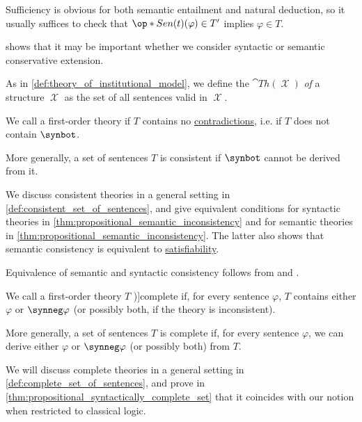 \begin{definition}
\begin{thmenum}
    Sufficiency is obvious for both semantic entailment and natural deduction, so it usually suffices to check that \( \op*{Sen}(t)(\varphi) \in T' \) implies \( \varphi \in T \).

     shows that it may be important whether we consider syntactic or semantic conservative extension.

     As in \cref{def:theory_of_institutional_model}, we define the  \( \cat{Th}(\mscrX) \) \emph{of} a structure \( \mscrX \) as the set of all sentences valid in \( \mscrX \).

     We call a first-order theory  if \( T \) contains no \hyperref[def:fol_semantics/tautology]{contradictions}, i.e. if \( T \) does not contain \( \synbot \).

    More generally, a set of sentences \( T \) is consistent if \( \synbot \) cannot be derived from it.

    We discuss consistent theories in a general setting in \cref{def:consistent_set_of_sentences}, and give equivalent conditions for syntactic theories in \cref{thm:propositional_semantic_inconsistency} and for semantic theories in \cref{thm:propositional_semantic_inconsistency}. The latter also shows that semantic consistency is equivalent to \hyperref[def:propositional_semantics/satisfaction]{satisfiability}.

    Equivalence of semantic and syntactic consistency follows from  and .

     We call a first-order theory \( T \) \term[ru=полное (множество формул) (\cite[def. 2.6.20]{Герасимов2014Вычислимость})]{complete} if, for every sentence \( \varphi \), \( T \) contains either \( \varphi \) or \( \synneg \varphi \) (or possibly both, if the theory is inconsistent).

    More generally, a set of sentences \( T \) is complete if, for every sentence \( \varphi \), we can derive either \( \varphi \) or \( \synneg \varphi \) (or possibly both) from \( T \).

    We will discuss complete theories in a general setting in \cref{def:complete_set_of_sentences}, and prove in \cref{thm:propositional_syntactically_complete_set} that it coincides with our notion when restricted to classical logic.


\end{thmenum}
\end{definition}

